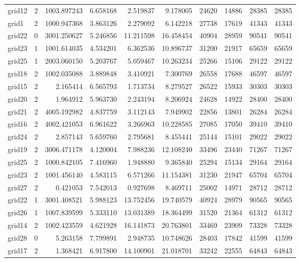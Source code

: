 \begin{longtable}{|l|r|r|r|r|r|r|r|r|r|}
grid12 & 2 & 1003.897243 & 6.658168 & 2.519837 & 9.178005 & 24620 & 14886 & 28385 & 28385 \\
grid1 & 2 & 1000.947368 & 3.863126 & 2.279092 & 6.142218 & 27738 & 17619 & 41343 & 41343 \\
grid22 & 0 & 3001.250627 & 5.246856 & 11.211598 & 16.458454 & 40904 & 28959 & 90541 & 90541 \\
grid23 & 1 & 1001.614035 & 4.534201 & 6.362536 & 10.896737 & 31200 & 21917 & 65659 & 65659 \\
grid25 & 1 & 2003.060150 & 5.203767 & 5.059467 & 10.263234 & 25266 & 15106 & 29122 & 29122 \\
grid18 & 2 & 1002.035088 & 3.889848 & 3.410921 & 7.300769 & 26558 & 17688 & 46597 & 46597 \\
grid15 & 2 & 2.165414 & 6.565793 & 1.713734 & 8.279527 & 26522 & 15933 & 30303 & 30303 \\
grid20 & 2 & 1.964912 & 5.963730 & 2.243194 & 8.206924 & 24628 & 14922 & 28400 & 28400 \\
grid21 & 2 & 4005.192982 & 4.837759 & 3.112143 & 7.949902 & 22856 & 13801 & 26284 & 26284 \\
grid16 & 2 & 4002.421053 & 6.961622 & 3.266963 & 10.228585 & 27085 & 17050 & 39410 & 39410 \\
grid24 & 2 & 2.857143 & 5.659760 & 2.795681 & 8.455441 & 25144 & 15101 & 29022 & 29022 \\
grid19 & 2 & 3006.471178 & 4.120004 & 7.988236 & 12.108240 & 33496 & 23440 & 71267 & 71267 \\
grid25 & 2 & 1000.842105 & 7.416960 & 1.948880 & 9.365840 & 25294 & 15134 & 29164 & 29164 \\
grid23 & 2 & 1001.456140 & 4.583115 & 6.571266 & 11.154381 & 31230 & 21947 & 65704 & 65704 \\
grid27 & 2 & 0.421053 & 7.542013 & 0.927698 & 8.469711 & 25002 & 14971 & 28712 & 28712 \\
grid22 & 1 & 3001.408521 & 5.988123 & 13.752456 & 19.740579 & 40924 & 28979 & 90565 & 90565 \\
grid26 & 1 & 1007.839599 & 5.333110 & 13.031389 & 18.364499 & 31520 & 21364 & 61312 & 61312 \\
grid14 & 2 & 1002.423559 & 4.621928 & 16.141873 & 20.763801 & 33469 & 23909 & 73328 & 73328 \\
grid28 & 0 & 5.263158 & 7.799891 & 2.948735 & 10.748626 & 28403 & 17842 & 41599 & 41599 \\
grid17 & 2 & 1.368421 & 6.917800 & 14.100901 & 21.018701 & 33242 & 22555 & 64843 & 64843 \\

\end{longtable}
